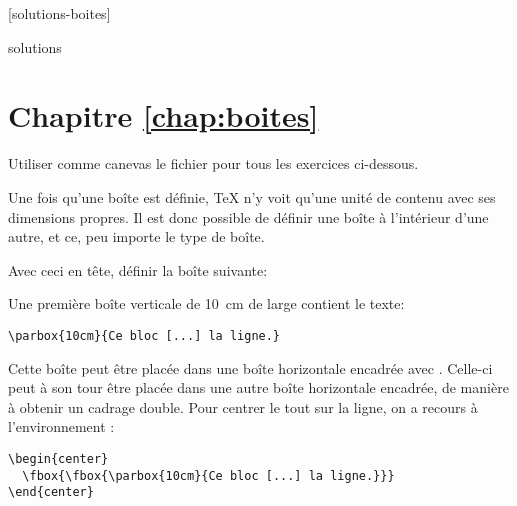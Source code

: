 [solutions-boites]

\begin{Filesave}{solutions}
\section*{Chapitre \ref*{chap:boites}}

\end{Filesave}

\noindent%
Utiliser comme canevas le fichier  pour
tous les exercices ci-dessous.

\begin{exercice}
  Une fois qu'une boîte est définie, {\TeX} n'y voit qu'une unité de
  contenu avec ses dimensions propres. Il est donc possible de définir
  une boîte à l'intérieur d'une autre, et ce, peu importe le type de
  boîte.

  Avec ceci en tête, définir la boîte suivante:
  \begin{center}
  \end{center}

  \begin{sol}
    Une première boîte verticale de 10~cm de large contient le texte:
\begin{lstlisting}
\parbox{10cm}{Ce bloc [...] la ligne.}
\end{lstlisting}
    Cette boîte peut être placée dans une boîte horizontale encadrée
    avec \cmd{\fbox}. Celle-ci peut à son tour être placée dans une autre
    boîte horizontale encadrée, de manière à obtenir un cadrage
    double. Pour centrer le tout sur la ligne, on a recours à
    l'environnement :
\begin{lstlisting}
\begin{center}
  \fbox{\fbox{\parbox{10cm}{Ce bloc [...] la ligne.}}}
\end{center}
\end{lstlisting}
  \end{sol}
\end{exercice}

